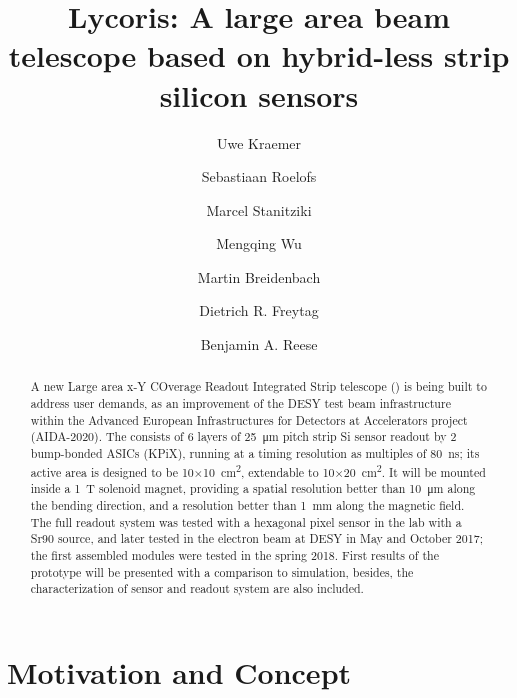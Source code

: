



\title{{\sc Lycoris}{\bf : A large area beam telescope based on hybrid-less strip silicon sensors}}
\author[1]{Uwe Kraemer}
\author[2,1]{Sebastiaan Roelofs}
\author[1]{Marcel Stanitziki}
\author[1]{Mengqing Wu}
\author[3]{Martin Breidenbach}
\author[3]{Dietrich R. Freytag}
\author[3]{Benjamin A. Reese}

\maketitle

\begin{abstract}

A new Large area x-Y COverage Readout Integrated Strip telescope (\lycoris) is being built to address user demands,
as an improvement of the DESY test beam infrastructure within the Advanced European Infrastructures for Detectors at Accelerators project (AIDA-2020).
The \lycoris consists of 6 layers of \SI{25}{\micro\metre} pitch strip Si sensor readout by 2 bump-bonded ASICs (KPiX),
running at a timing resolution as multiples of \SI{80}{\nano\second};
its active area is designed to be 10$\times$\SI{10}{\square\centi\metre}, extendable to 10$\times$\SI{20}{\square\centi\metre}.
It will be mounted inside a \SI{1}{\tesla} solenoid magnet,
providing a spatial resolution better than \SI{10}{\micro\metre} along the bending direction,
and a resolution better than \SI{1}{\milli\metre} along the magnetic field.
The full readout system was tested with a hexagonal pixel sensor in the lab with a Sr90 source,
and later tested in the electron beam at DESY in May and October 2017;
the first assembled modules were tested in the spring 2018.
First results of the \lycoris prototype will be presented with a comparison to simulation,
besides, the characterization of sensor and readout system are also included.
\end{abstract}

\section*{Motivation and Concept}

